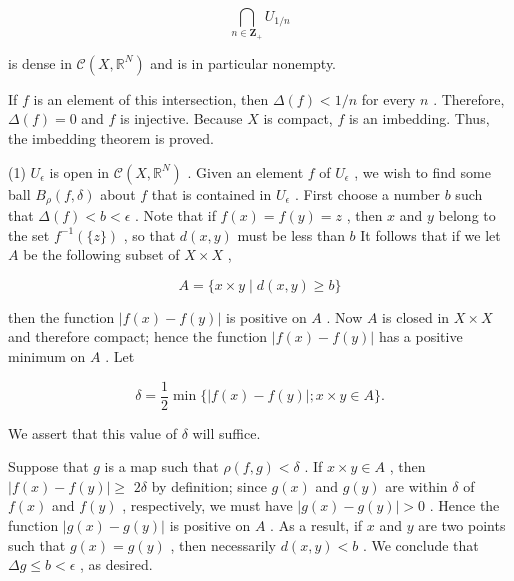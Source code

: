 \[
\mathop{\bigcap }\limits_{{n \in  {\mathbf{Z}}_{ + }}}{U}_{1/n}
\]

is dense in \(\mathcal{C}\left( {X,{\mathbb{R}}^{N}}\right)\) and is in particular nonempty.

If \(f\) is an element of this intersection, then \(\Delta \left( f\right)  < 1/n\) for every \(n\) . Therefore, \(\Delta \left( f\right)  = 0\) and \(f\) is injective. Because \(X\) is compact, \(f\) is an imbedding. Thus, the imbedding theorem is proved.

(1) \({U}_{\epsilon }\) is open in \(\mathcal{C}\left( {X,{\mathbb{R}}^{N}}\right)\) . Given an element \(f\) of \({U}_{\epsilon }\) , we wish to find some ball \({B}_{\rho }\left( {f,\delta }\right)\) about \(f\) that is contained in \({U}_{\epsilon }\) . First choose a number \(b\) such that \(\Delta \left( f\right)  < b < \epsilon\) . Note that if \(f\left( x\right)  = f\left( y\right)  = z\) , then \(x\) and \(y\) belong to the set \({f}^{-1}\left( {\{ z\} }\right)\) , so that \(d\left( {x,y}\right)\) must be less than \(b\) It follows that if we let \(A\) be the following subset of \(X \times  X\) ,

\[
A = \{ x \times  y \mid  d\left( {x,y}\right)  \geq  b\}
\]

then the function \(\left| {f\left( x\right)  - f\left( y\right) }\right|\) is positive on \(A\) . Now \(A\) is closed in \(X \times  X\) and therefore compact; hence the function \(\left| {f\left( x\right)  - f\left( y\right) }\right|\) has a positive minimum on \(A\) . Let

\[
\delta  = \frac{1}{2}\min \{ \left| {f\left( x\right)  - f\left( y\right) }\right| ;x \times  y \in  A\} .
\]

We assert that this value of \(\delta\) will suffice.

Suppose that \(g\) is a map such that \(\rho \left( {f,g}\right)  < \delta\) . If \(x \times  y \in  A\) , then \(\left| {f\left( x\right)  - f\left( y\right) }\right|  \geq\)  \({2\delta }\) by definition; since \(g\left( x\right)\) and \(g\left( y\right)\) are within \(\delta\) of \(f\left( x\right)\) and \(f\left( y\right)\) , respectively, we must have \(\left| {g\left( x\right)  - g\left( y\right) }\right|  > 0\) . Hence the function \(\left| {g\left( x\right)  - g\left( y\right) }\right|\) is positive on \(A\) . As a result, if \(x\) and \(y\) are two points such that \(g\left( x\right)  = g\left( y\right)\) , then necessarily \(d\left( {x,y}\right)  < b\) . We conclude that \({\Delta g} \leq  b < \epsilon\) , as desired.

